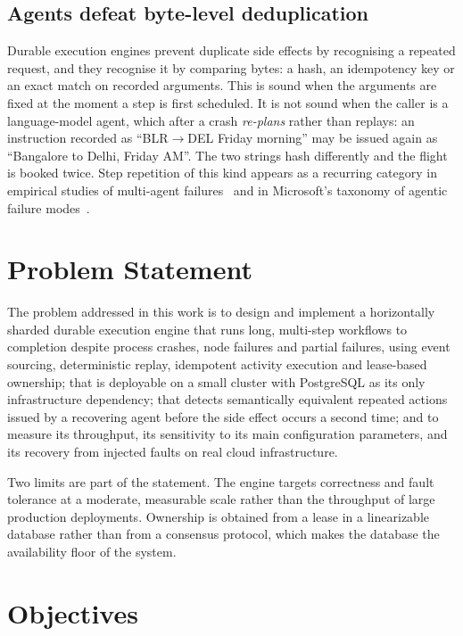 \subsection{Agents defeat byte-level deduplication}

Durable execution engines prevent duplicate side effects by recognising a
repeated request, and they recognise it by comparing bytes: a hash, an
idempotency key or an exact match on recorded arguments. This is sound when
the arguments are fixed at the moment a step is first scheduled. It is not
sound when the caller is a language-model agent, which after a crash
\emph{re-plans} rather than replays: an instruction recorded as
``BLR$\rightarrow$DEL Friday morning'' may be issued again as ``Bangalore to
Delhi, Friday AM''. The two strings hash differently and the flight is booked
twice. Step repetition of this kind appears as a recurring category in
empirical studies of multi-agent failures~\cite{whyfail2025} and in
Microsoft's taxonomy of agentic failure modes~\cite{msredteam2025}.

\section{Problem Statement}

The problem addressed in this work is to design and implement a horizontally
sharded durable execution engine that runs long, multi-step workflows to
completion despite process crashes, node failures and partial failures, using
event sourcing, deterministic replay, idempotent activity execution and
lease-based ownership; that is deployable on a small cluster with PostgreSQL
as its only infrastructure dependency; that detects semantically equivalent
repeated actions issued by a recovering agent before the side effect occurs a
second time; and to measure its throughput, its sensitivity to its main
configuration parameters, and its recovery from injected faults on real cloud
infrastructure.

Two limits are part of the statement. The engine targets correctness and fault
tolerance at a moderate, measurable scale rather than the throughput of
large production deployments. Ownership is obtained from a lease in a
linearizable database rather than from a consensus protocol, which makes the
database the availability floor of the system.

\section{Objectives}

